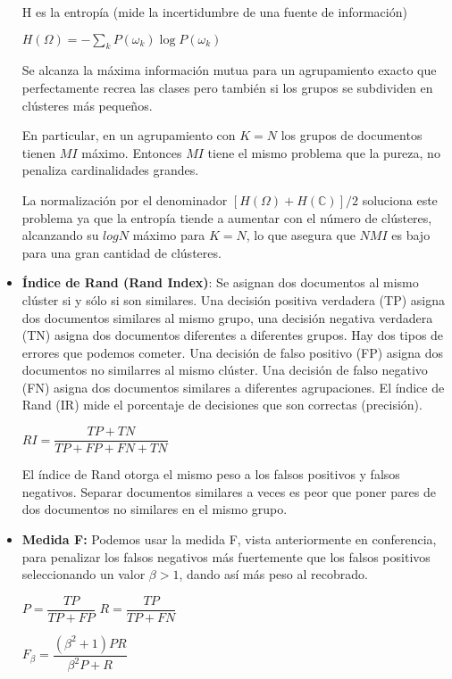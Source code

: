 \documentclass{llncs}
\begin{document}
\begin{itemize}
	\vspace{0.5em}
	H es la entropía (mide la incertidumbre de una fuente de información)
	
	\begin{center}
		$ H(\Omega) = -\sum_{k}P(\omega_{k}) \log P(\omega_{k}) $
	\end{center}
	
	Se alcanza la máxima información mutua para un agrupamiento exacto que perfectamente recrea las clases pero también si los grupos se subdividen en cl\'usteres más pequeños. 
	
	En particular, en un agrupamiento con $ K = N $ los grupos de documentos tienen $ MI $ máximo. Entonces $ MI $ tiene el mismo problema que la pureza, no penaliza cardinalidades grandes.
	
	La normalización por el denominador $ [H(\Omega) + H(\mathbb{C})]/2 $ soluciona este problema ya que la entropía tiende a aumentar con el número de cl\'usteres, alcanzando su $ log N $ máximo para $ K = N $, lo que asegura que $ NMI $ es bajo para una gran cantidad de cl\'usteres.
	
	\vspace{1em}
	\item \textbf{\'Indice de Rand (Rand Index)}: Se asignan dos documentos al mismo clúster si y sólo si son similares. Una decisión positiva verdadera (TP) asigna
	dos documentos similares al mismo grupo, una decisión negativa verdadera (TN) asigna dos documentos diferentes a diferentes grupos. Hay dos tipos
	de errores que podemos cometer. Una decisión de falso positivo (FP) asigna dos documentos no similarres al mismo clúster. Una decisión de falso negativo (FN) asigna
	dos documentos similares a diferentes agrupaciones. El índice de Rand (IR) mide el porcentaje de decisiones que son correctas (precisión).
	
	\begin{center}
		$ RI = \dfrac{TP + TN}{TP + FP + FN + TN} $
	\end{center}
	
	El índice de Rand otorga el mismo peso a los falsos positivos y falsos negativos. Separar documentos similares a veces es peor que poner pares de dos documentos no similares en el mismo grupo.
	
	\vspace{1em}
	\item \textbf{Medida F:} Podemos usar la medida F, vista anteriormente en conferencia, para penalizar los falsos negativos más fuertemente que los falsos positivos seleccionando un valor $ \beta > 1 $, dando así más peso al recobrado.
	\begin{center}
		$ P = \dfrac{TP}{TP + FP}  $ \hspace{2em}
		$ R = \dfrac{TP}{TP + FN} $
		
		\vspace{1em}
		$ F_{\beta} = \dfrac{(\beta^{2} + 1)PR}{\beta^{2}P + R} $
	\end{center}
\end{itemize}
\end{document}
